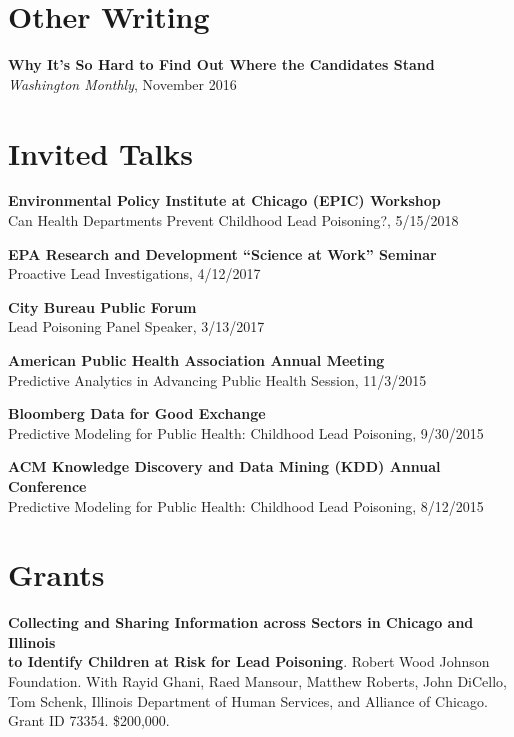 \documentclass[margin,line]{resume}
\begin{document}
\begin{resume}

        \section{\mysidestyle Other Writing}
        {\bf Why It's So Hard to Find Out Where the Candidates Stand} \\
        \textit{Washington Monthly}, November 2016

	\section{\mysidestyle Invited Talks}
        
	{\bf Environmental Policy Institute at Chicago (EPIC) Workshop} \\
        Can Health Departments Prevent Childhood Lead Poisoning?, 5/15/2018

	{\bf EPA Research and Development ``Science at Work'' Seminar} \\
        Proactive Lead Investigations, 4/12/2017

	{\bf City Bureau Public Forum} \\
        Lead Poisoning Panel Speaker, 3/13/2017 

	{\bf American Public Health Association Annual Meeting} \\
    Predictive Analytics in Advancing Public Health Session, 11/3/2015 

	{\bf Bloomberg Data for Good Exchange} \\
        Predictive Modeling for Public Health: Childhood Lead Poisoning, 9/30/2015 

    {\bf ACM Knowledge Discovery and Data Mining (KDD) Annual Conference} \\
        Predictive Modeling for Public Health: Childhood Lead Poisoning, 8/12/2015

	\section{\mysidestyle Grants}
        {\bf Collecting and Sharing Information across Sectors in Chicago and Illinois\\ to Identify Children at Risk for Lead Poisoning}. Robert Wood Johnson\\ Foundation. With Rayid Ghani, Raed Mansour, Matthew Roberts, John DiCello,\\ Tom Schenk,  Illinois Department of Human Services, and Alliance of Chicago.\\ Grant ID 73354. \$200,000. \\


\end{resume}
\end{document}
